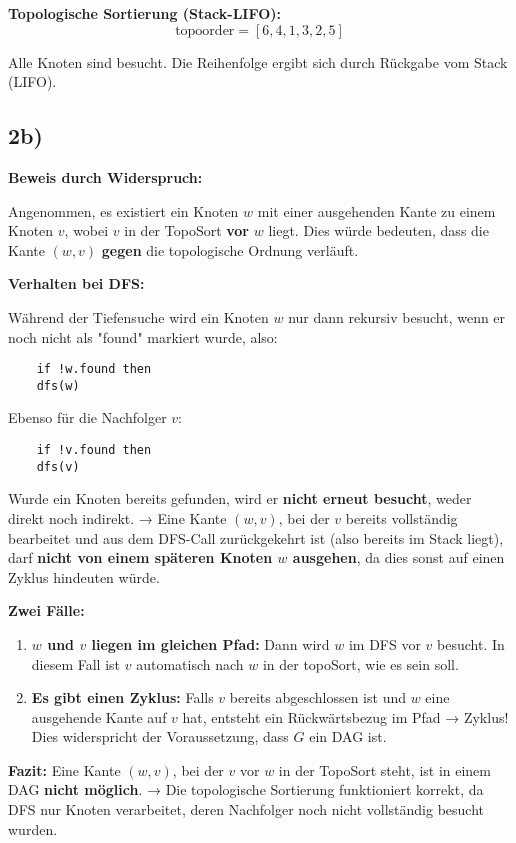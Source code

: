 \vspace{1em}
\textbf{Topologische Sortierung (Stack-LIFO):}  
\[
\text{topoorder} = [6, 4, 1, 3, 2, 5]
\]

Alle Knoten sind besucht. Die Reihenfolge ergibt sich durch Rückgabe vom Stack (LIFO).

\vspace{1.5em}
\subsection*{2b)}

\textbf{Beweis durch Widerspruch:}  

Angenommen, es existiert ein Knoten $w$ mit einer ausgehenden Kante zu einem Knoten $v$, wobei $v$ in der TopoSort \textbf{vor} $w$ liegt. Dies würde bedeuten, dass die Kante $(w, v)$ \textbf{gegen} die topologische Ordnung verläuft.

\textbf{Verhalten bei DFS:}

Während der Tiefensuche wird ein Knoten $w$ nur dann rekursiv besucht, wenn er noch nicht als "found" markiert wurde, also:

\begin{verbatim}
	if !w.found then
	dfs(w)
\end{verbatim}

Ebenso für die Nachfolger $v$:

\begin{verbatim}
	if !v.found then
	dfs(v)
\end{verbatim}

Wurde ein Knoten bereits gefunden, wird er \textbf{nicht erneut besucht}, weder direkt noch indirekt.  
→ Eine Kante $(w, v)$, bei der $v$ bereits vollständig bearbeitet und aus dem DFS-Call zurückgekehrt ist (also bereits im Stack liegt), darf \textbf{nicht von einem späteren Knoten $w$ ausgehen}, da dies sonst auf einen Zyklus hindeuten würde.

\vspace{0.5em}
\textbf{Zwei Fälle:}

\begin{enumerate}
	\item \textbf{$w$ und $v$ liegen im gleichen Pfad:}  
	Dann wird $w$ im DFS vor $v$ besucht. In diesem Fall ist $v$ automatisch nach $w$ in der topoSort, wie es sein soll.
	
	\item \textbf{Es gibt einen Zyklus:}  
	Falls $v$ bereits abgeschlossen ist und $w$ eine ausgehende Kante auf $v$ hat, entsteht ein Rückwärtsbezug im Pfad → Zyklus! Dies widerspricht der Voraussetzung, dass $G$ ein DAG ist.
\end{enumerate}

\vspace{0.5em}
\textbf{Fazit:}  
Eine Kante $(w, v)$, bei der $v$ vor $w$ in der TopoSort steht, ist in einem DAG \textbf{nicht möglich}.  
→ Die topologische Sortierung funktioniert korrekt, da DFS nur Knoten verarbeitet, deren Nachfolger noch nicht vollständig besucht wurden.

